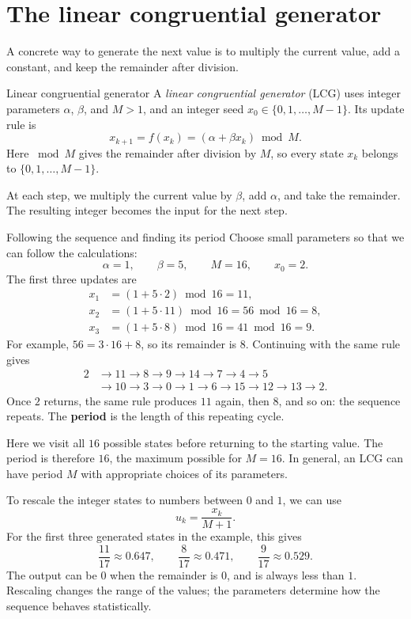 \documentclass[a4paper,12pt,oneside]{report}
\begin{document}
\section{The linear congruential generator}
\label{sec:lcg}
A concrete way to generate the next value is to multiply the current
value, add a constant, and keep the remainder after division.

\begin{frameddefn}{Linear congruential generator}
\label{def:lcg}
A \emph{linear congruential generator} (LCG) uses integer parameters
$\alpha$, $\beta$, and $M>1$, and an integer seed
$x_0\in\{0,1,\ldots,M-1\}$. Its update rule is
\[
  x_{k+1}=f(x_k)=(\alpha+\beta x_k)\bmod M.
\]
Here $\bmod M$ gives the remainder after division by $M$, so every
state $x_k$ belongs to $\{0,1,\ldots,M-1\}$.
\end{frameddefn}

At each step, we multiply the current value by $\beta$, add $\alpha$,
and take the remainder. The resulting integer becomes the input
for the next step.

\begin{framedexample}{Following the sequence and finding its period}
Choose small parameters so that we can follow the calculations:
\[
  \alpha=1,\qquad \beta=5,\qquad M=16,\qquad x_0=2.
\]
The first three updates are
\[
  \begin{aligned}
    x_1&=(1+5\cdot2)\bmod16=11,\\
    x_2&=(1+5\cdot11)\bmod16=56\bmod16=8,\\
    x_3&=(1+5\cdot8)\bmod16=41\bmod16=9.
  \end{aligned}
\]
For example, $56=3\cdot16+8$, so its remainder is $8$.
Continuing with the same rule gives
\[
  \begin{aligned}
    2&\to11\to8\to9\to14\to7\to4\to5\\
     &\to10\to3\to0\to1\to6\to15\to12\to13\to2.
  \end{aligned}
\]
Once $2$ returns, the same rule produces $11$ again, then $8$, and
so on: the sequence repeats. The \textbf{period} is the length of
this repeating cycle.

Here we visit all $16$ possible states before returning to the
starting value. The period is therefore $16$, the maximum possible
for $M=16$. In general, an LCG can have period $M$ with appropriate
choices of its parameters.
\end{framedexample}

To rescale the integer states to numbers between $0$ and $1$, we can
use
\[
  u_k=\frac{x_k}{M+1}.
\]
For the first three generated states in the example, this gives
\[
  \frac{11}{17}\approx0.647,\qquad
  \frac8{17}\approx0.471,\qquad
  \frac9{17}\approx0.529.
\]
The output can be $0$ when the remainder is $0$, and is always less
than $1$. Rescaling changes the range of the values; the parameters
determine how the sequence behaves statistically.
\end{document}
